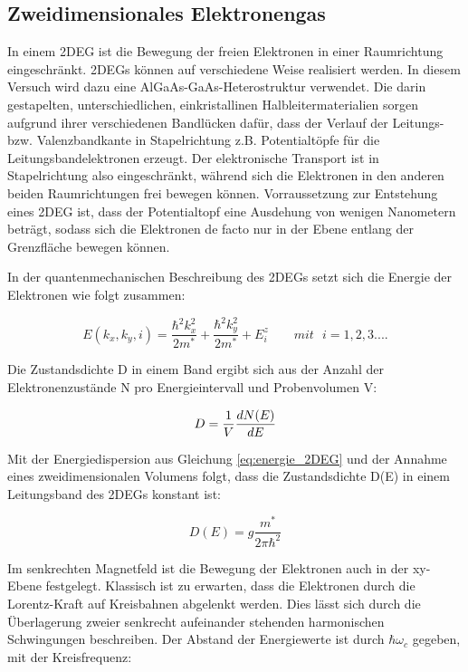 
\subsection{Zweidimensionales Elektronengas}

In einem 2DEG ist die Bewegung der freien Elektronen in einer Raumrichtung eingeschränkt. 2DEGs können auf verschiedene Weise realisiert werden. In diesem Versuch wird dazu eine AlGaAs-GaAs-Heterostruktur verwendet. Die darin gestapelten, unterschiedlichen, einkristallinen Halbleitermaterialien sorgen aufgrund ihrer verschiedenen Bandlücken dafür, dass der Verlauf der Leitungs- bzw. Valenzbandkante in Stapelrichtung z.B. Potentialtöpfe für die Leitungsbandelektronen erzeugt. Der elektronische Transport ist in Stapelrichtung also eingeschränkt, während sich die Elektronen in den anderen beiden Raumrichtungen frei bewegen können.
Vorraussetzung zur Entstehung eines 2DEG ist, dass der Potentialtopf eine Ausdehung von wenigen Nanometern beträgt, sodass sich die Elektronen de facto nur in der Ebene entlang der Grenzfläche bewegen können. 

In der quantenmechanischen Beschreibung des 2DEGs setzt sich die Energie der Elektronen wie folgt zusammen:

\begin{equation}
E(k_x,k_y,i)=\frac{\hbar^2k_x^2}{2m^*}+\frac{\hbar^2k_y^2}{2m^*}+E_i^z   ~~~~~~~~~ mit ~~~i=1,2,3....
\label{eq:energie_2DEG}
\end{equation}

Die Zustandsdichte D in einem Band ergibt sich aus der Anzahl der Elektronenzustände N pro Energieintervall und Probenvolumen V:

\begin{equation}
	D=\frac{1}{V}\frac{d N(E)}{d E}
	\label{eq:2DEG_zustandsdich} 
\end{equation}

Mit der Energiedispersion aus Gleichung \ref{eq:energie_2DEG} und der Annahme eines zweidimensionalen Volumens folgt, dass die Zustandsdichte D(E) in einem Leitungsband des 2DEGs konstant ist:

\begin{equation}
D(E)=g\frac{m^*}{2\pi\hbar^2}
\label{eq:2deg_zustandsdichte}
\end{equation}

Im senkrechten Magnetfeld ist die Bewegung der Elektronen auch in der xy-Ebene festgelegt. Klassisch ist zu erwarten, dass die Elektronen durch die Lorentz-Kraft auf Kreisbahnen abgelenkt werden.
Dies lässt sich durch die Überlagerung zweier senkrecht aufeinander stehenden harmonischen Schwingungen beschreiben. Der Abstand der Energiewerte ist durch $\hbar \omega_c$ gegeben,
mit der Kreisfrequenz:

